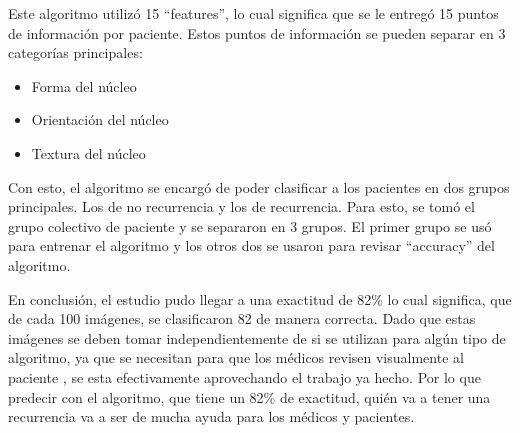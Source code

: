 \documentclass[12pt, letterpaper]{article}
\begin{document}
Este algoritmo utilizó 15 \enquote{features}, lo cual significa que se le entregó 15 puntos de información por paciente. Estos puntos de información se pueden separar en 3 categorías principales:

\begin{itemize}
	\item Forma del núcleo
	\item Orientación del núcleo
	\item Textura del núcleo
\end{itemize}

Con esto, el algoritmo se encargó de poder clasificar a los pacientes en dos grupos principales. Los de no recurrencia y los de recurrencia. Para esto, se tomó el grupo colectivo de paciente y se separaron en 3 grupos. El primer grupo se usó para entrenar el algoritmo y los otros dos se usaron para revisar \enquote{accuracy} del algoritmo.

En conclusión, el estudio pudo llegar a una exactitud de 82\% lo cual significa, que de cada 100 imágenes, se clasificaron 82 de manera correcta. Dado que estas imágenes se deben tomar independientemente de si se utilizan para algún tipo de algoritmo, ya que se necesitan para que los médicos revisen visualmente al paciente , se esta efectivamente aprovechando el trabajo ya hecho. Por lo que predecir con el algoritmo, que tiene un 82\% de exactitud, quién va a tener una recurrencia va a ser de mucha ayuda para los médicos y pacientes.


\newpage

\printbibliography
\end{document}
